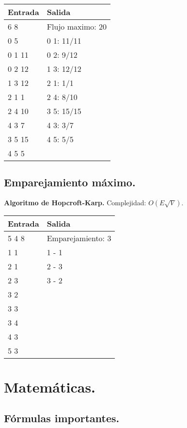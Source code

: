 \documentclass[10pt, letterpaper, twoside]{article}
\begin{document}


\begin{tabular}{|p{7cm}|p{7cm}|}
\hline
\textbf{Entrada} & \textbf{Salida} \\ \hline
6 8    & Flujo maximo: 20 \\
0 5    & 0 1: 11/11 \\ 
0 1 11 & 0 2: 9/12  \\
0 2 12 & 1 3: 12/12 \\
1 3 12 & 2 1: 1/1 \\
2 1 1  & 2 4: 8/10 \\
2 4 10 & 3 5: 15/15 \\
4 3 7  & 4 3: 3/7 \\
3 5 15 & 4 5: 5/5 \\
4 5 5  & \\ \hline
\end{tabular}

\subsection{Emparejamiento máximo.}

\textbf{Algoritmo de Hopcroft-Karp.} Complejidad: $O(E \sqrt{V})$.



\begin{tabular}{|p{7cm}|p{7cm}|}
\hline
\textbf{Entrada} & \textbf{Salida} \\ \hline
5 4 8 & Emparejamiento: 3 \\
1 1   & 1 - 1 \\
2 1   & 2 - 3 \\
2 3   & 3 - 2 \\
3 2   & \\
3 3   & \\
3 4   & \\
4 3   & \\
5 3   & \\ \hline
\end{tabular}


\section{Matemáticas.}

\subsection{Fórmulas importantes.}
\end{document}
